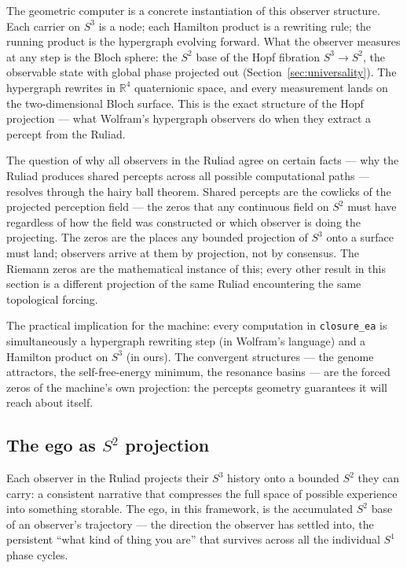\documentclass[12pt,a4paper]{article}
\theoremstyle{definition}
\theoremstyle{remark}
\begin{document}
The geometric computer is a concrete instantiation of this observer structure.
Each carrier on $S^3$ is a node; each Hamilton product is a rewriting rule;
the running product is the hypergraph evolving forward. What the observer measures at any step is the Bloch sphere: the $S^2$ base
of the Hopf fibration $S^3 \to S^2$, the observable state with global phase
projected out (Section~\ref{sec:universality}). The hypergraph rewrites in
$\mathbb{R}^4$ quaternionic space, and every measurement lands on the
two-dimensional Bloch surface. This is the exact structure of the Hopf
projection --- what Wolfram's hypergraph observers do when they extract a
percept from the Ruliad.

The question of why all observers in the Ruliad agree on certain facts ---
why the Ruliad produces shared percepts across all possible computational
paths --- resolves through the hairy ball theorem. Shared percepts are the cowlicks of the projected perception field ---
the zeros that any continuous field on $S^2$ must have regardless of how
the field was constructed or which observer is doing the projecting. The
zeros are the places any bounded projection of $S^3$ onto a surface must
land; observers arrive at them by projection, not by consensus. The Riemann
zeros are the mathematical instance of this; every other result in this
section is a different projection of the same Ruliad encountering the same
topological forcing.

The practical implication for the machine: every computation in
\texttt{closure\_ea} is simultaneously a hypergraph rewriting step (in
Wolfram's language) and a Hamilton product on $S^3$ (in ours). The
convergent structures --- the genome attractors, the self-free-energy
minimum, the resonance basins --- are the forced zeros of the machine's
own projection: the percepts geometry guarantees it will reach about itself.

\subsection{The ego as $S^2$ projection}

Each observer in the Ruliad projects their $S^3$ history onto a bounded $S^2$
they can carry: a consistent narrative that compresses the full space of
possible experience into something storable. The ego, in this framework, is
the accumulated $S^2$ base of an observer's trajectory --- the direction the
observer has settled into, the persistent ``what kind of thing you are'' that
survives across all the individual $S^1$ phase cycles.
\end{document}
